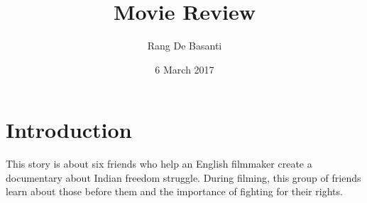 \documentclass{article}
\title{Movie Review}
\author{Rang De Basanti}
\date{6 March 2017}
\begin{document}
\maketitle

\section{Introduction}
This story is about six friends who help an English filmmaker create a documentary about Indian freedom struggle. During filming, this group of friends learn about those before them and the importance of fighting for their rights. 
\end{document}
